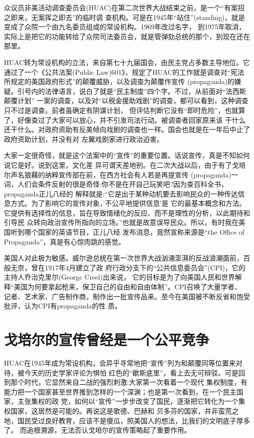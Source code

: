 \documentclass[10pt]{article}
\begin{document}
{众议员非美活动调查委员会(HUAC)在第二次世界大战结束之前，是一个``有案招之即来，无案挥之即去''的临时调
查机构。可是在1945年``站住''(standing)，就是变成了众院一个由九名委员组成的常设机构。1969年改过名字，
到1975年取消，实际上是把它的功能转给了众院司法委员会，就是管弹劾总统的那个，到现在还在那里。

HUAC转为常设机构的立法，来自第七十九届国会，由民主党占多数主导地位。它通过了一个《公共法案(Public
Law)601》，规定了HUAC的工作就是调查对``宪法所规定的美国政府形式''的颠覆威胁，以及调查为颠覆作宣传
(propaganda)的嫌疑。引号内的法律语言，说白了就是``民主制度''四个字。不过，从前面对``法西斯颠覆计划''
一案的调查，以及对``以税金援助戏剧''的调查，都可以看到，这种调查只不过是调查。前者虽确定有阴谋计划，
但评估判断它没有``即时危险''，也就算了，好像查过了大家可以放心，并不引发司法行动。被调查者回家原来该
干什么还干什么。对政府资助有反美倾向戏剧的调查也一样。国会也就是在一年后中止了政府资助计划，并没有对
左翼戏剧家进行政治迫害。

大家一定很奇怪，就是这个法案中的``宣传''的重要位置。话说宣传，真是不知如何说它是好。说到这里，文化差
异可谓天差地别。在二次大战以后，由于有了戈培尔声名狼藉的纳粹宣传部在前，在西方社会有人若是再提宣传
(propaganda)一词，人们会条件反射的很是奇怪:你不是在开自己玩笑吧?因为查百科全书，propaganda正儿八经的
解释就是:``它是出于某种动机要去影响民众的一种传达信息方式。为了影响它的宣传对象，'不公平地提供信息'是
它的最基本概念和方法。它提供有选择性的信息，旨在导致情绪化的反应、而不是理性的分析，以此期待和引导民
众转向政治宣传所指向的立场。''也就是故意误导民众。所以，有时我在美国听到哪个国家的英语节目，正儿八经
发布消息，竟然宣称来源是``the Office of Propaganda''，真是有心惊肉跳的感觉。

美国人对此极为敏感。威尔逊总统在第一次世界大战汹涌澎湃的反战浪潮面前，百般无奈，曾在1917年4月建立了政
府行政分支下的``公共信息委员会''(CPI)，它的主持人乔治\textperiodcentered 克里尔(George Creel)出来说，
它的目标是为了向美国人民和世界解释``美国为何要拿起枪来，保卫自己的自由和自由体制''。CPI召唤了大量学者、
记者、艺术家、广告制作商，制作出一批宣传品来。至今在美国被不断反省和饱受批评，认为CPI有propaganda的性
质。

\pagebreak
\section{戈培尔的宣传曾经是一个公平竞争}

HUAC在1945年成为常设机构，会异乎寻常地把``宣传''列为和颠覆同等位置来对待，被今天的历史学家评论为惧怕
红色的``歇斯底里''，看上去无可辩驳。可是回到那个时代，它显然来自二战的强烈刺激:大家第一次看着一个现代
集权制度，有能力把一个国家甚至世界推到怎样的一个深渊；也是第一次看到，在一个民主国家，主张集权的政
党，如何以``宣传''一步步改变了国民，逐渐把它转化为一个集权国家，这居然是可能的。再说这是歌德、巴赫和
贝多芬的国家，并非蛮荒之地，国民受过良好教育，应该不是傻瓜，照美国人的想法，比我们的文明底子厚多了。
而追根溯源，无法否认戈培尔的宣传策略起了重要作用。

}
\end{document}
